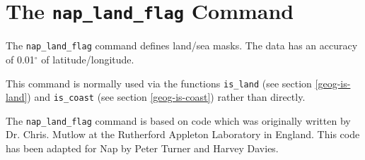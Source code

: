 
\section{The \texttt{nap\_land\_flag} Command}
    \label{land-flag}
    \label{land-flag-nap-land-flag}

The \texttt{nap\_land\_flag} command
defines land/sea masks.
The data has an accuracy of 0.01$^{\circ}$ of latitude/longitude.

This command is normally used via the functions 
\texttt{is\_land}
(see section \ref{geog-is-land})
and 
\texttt{is\_coast}
(see section \ref{geog-is-coast})
rather than directly.

The \texttt{nap\_land\_flag} command
is based on code which was originally written by
Dr. Chris. Mutlow at the Rutherford Appleton Laboratory in England.
This code has been adapted for Nap by Peter Turner and Harvey Davies.
